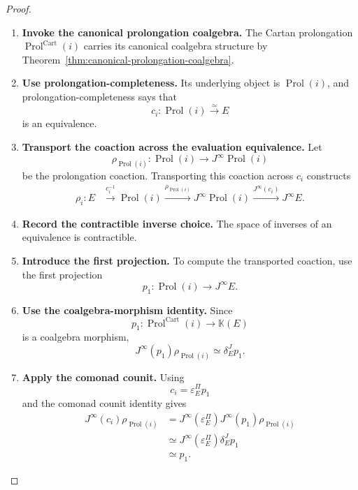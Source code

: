 \begin{proof}
\leavevmode
\begin{enumerate}[label=\textup{(\arabic*)}]
    \item \textbf{Invoke the canonical prolongation coalgebra.}
The Cartan prolongation \(\operatorname{Prol}^{\mathrm{Cart}}(i)\) carries its canonical coalgebra structure by
Theorem~\ref{thm:canonical-prolongation-coalgebra}.

    \item \textbf{Use prolongation-completeness.}
Its underlying object is
\(\operatorname{Prol}(i)\), and prolongation-completeness says that
\[
  c_i:\operatorname{Prol}(i)\xrightarrow{\simeq}E
\]
is an equivalence.

    \item \textbf{Transport the coaction across the evaluation equivalence.}
Let
\[
  \rho_{\operatorname{Prol}(i)}:\operatorname{Prol}(i)\to J^\infty \operatorname{Prol}(i)
\]
be the prolongation coaction. Transporting this coaction across
\(c_i\) constructs
\[
\begin{aligned}
  \rho_i:
  E
  &\xrightarrow{c_i^{-1}}
  \operatorname{Prol}(i)
  \xrightarrow{\rho_{\operatorname{Prol}(i)}}
  J^\infty \operatorname{Prol}(i)
  \xrightarrow{J^\infty(c_i)}
  J^\infty E.
\end{aligned}
\]

    \item \textbf{Record the contractible inverse choice.}
The space of inverses of an equivalence is contractible.

    \item \textbf{Introduce the first projection.}
To compute the transported coaction, use the first projection
\[
  p_1:\operatorname{Prol}(i)\to J^\infty E.
\]

    \item \textbf{Use the coalgebra-morphism identity.}
Since
\[
  p_1:\operatorname{Prol}^{\mathrm{Cart}}(i)\to\mathbb K(E)
\]
is a coalgebra morphism,
\[
  J^\infty(p_1)\rho_{\operatorname{Prol}(i)}
  \simeq
  \delta^J_Ep_1.
\]

    \item \textbf{Apply the comonad counit.}
Using
\[
  c_i=\varepsilon^\Pi_Ep_1
\]
and the comonad counit identity gives
\[
\begin{aligned}
  J^\infty(c_i)\rho_{\operatorname{Prol}(i)}
  &=
  J^\infty(\varepsilon^\Pi_E)
  J^\infty(p_1)\rho_{\operatorname{Prol}(i)}\\
  &\simeq
  J^\infty(\varepsilon^\Pi_E)\delta^J_Ep_1\\
  &\simeq
  p_1.
\end{aligned}
\]


\end{enumerate}
\end{proof}

